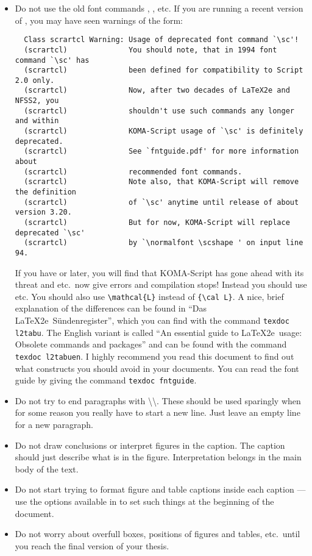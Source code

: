 \begin{itemize}
\item Do not use the old font commands , ,  etc.
  If you are running a recent version of \TeXLive, you may have seen warnings of the form:
  \begin{verbatim}
  Class scrartcl Warning: Usage of deprecated font command `\sc'!
  (scrartcl)              You should note, that in 1994 font command `\sc' has
  (scrartcl)              been defined for compatibility to Script 2.0 only.
  (scrartcl)              Now, after two decades of LaTeX2e and NFSS2, you
  (scrartcl)              shouldn't use such commands any longer and within
  (scrartcl)              KOMA-Script usage of `\sc' is definitely deprecated.
  (scrartcl)              See `fntguide.pdf' for more information about
  (scrartcl)              recommended font commands.
  (scrartcl)              Note also, that KOMA-Script will remove the definition
  (scrartcl)              of `\sc' anytime until release of about version 3.20.
  (scrartcl)              But for now, KOMA-Script will replace deprecated `\sc'
  (scrartcl)              by `\normalfont \scshape ' on input line 94.
  \end{verbatim}
  If you have  or later, you will find that KOMA-Script has gone ahead with its threat
  and  etc.\ now give errors and compilation stops!
  Instead you should use  etc.
  You should also use \verb|\mathcal{L}| instead of \verb|{\cal L}|.
  A nice, brief explanation of the differences can be found in \foreignlanguage{ngerman}{\enquote{Das \LaTeX2e\ Sündenregister}},
  which you can find with the command \texttt{texdoc l2tabu}.
  The English variant is called \enquote{An essential guide to \LaTeX2e\ usage: Obsolete commands and packages}
  and can be found with the command \texttt{texdoc l2tabuen}.
  I highly recommend you read this document to find out what constructs you should avoid in your documents.
  You can read the font guide by giving the command \texttt{texdoc fntguide}.

\item Do not try to end paragraphs with
  \textbackslash\textbackslash. These should be used sparingly when
  for some reason you really have to start a new line. Just leave an
  empty line for a new paragraph.

\item Do not draw conclusions or interpret figures in the caption. The
  caption should just describe what is in the figure. Interpretation
  belongs in the main body of the text.

\item Do not start trying to format figure and table captions inside
  each caption --- use the options available in \KOMAScript{} to set
  such things at the beginning of the document.

\item Do not worry about overfull boxes, positions of figures
  and tables, etc.\ until you reach the final version of your thesis.
\end{itemize}


